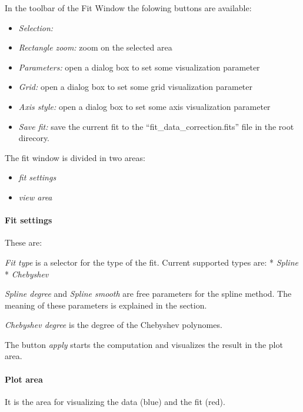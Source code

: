 \documentclass[letterpaper,10pt,english]{sphinxmanual}
\begin{document}
In the toolbar of the Fit Window the folowing buttons are available:
\begin{itemize}
\item {} 
\emph{Selection:}

\item {} 
\emph{Rectangle zoom:} zoom on the selected area

\item {} 
\emph{Parameters:} open a dialog box to set some visualization parameter

\item {} 
\emph{Grid:} open a dialog box to set some grid visualization parameter

\item {} 
\emph{Axis style:} open a dialog box to set some axis visualization parameter

\item {} 
\emph{Save fit:} save the current fit to the ``fit\_data\_correction.fits'' file in the root direcory.

\end{itemize}

The fit window is divided in two areas:
\begin{itemize}
\item {} 
\emph{fit settings}

\item {} 
\emph{view area}

\end{itemize}


\paragraph{Fit settings}
\label{guibp:fit-settings}
These are:

\emph{Fit type} is a selector for the type of the fit. Current supported types are:
* \emph{Spline}
* \emph{Chebyshev}

\emph{Spline degree} and \emph{Spline smooth} are free parameters for the spline method. The meaning of these parameters is explained in the {\hyperref[tuibp::doc]{}} section.

\emph{Chebyshev degree} is the degree of the Chebyshev polynomes.

The button \emph{apply} starts the computation and visualizes the result in the plot area.


\paragraph{Plot area}
\label{guibp:id2}
It is the area for visualizing the data (blue) and the fit (red).
\end{document}

